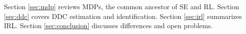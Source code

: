 Section \ref{sec:mdp} reviews MDPs, the common ancestor of SE and RL. Section \ref{sec:ddc} covers DDC estimation and identification. Section \ref{sec:irl} summarizes IRL. Section \ref{sec:conclusion} discusses differences and open problems.



